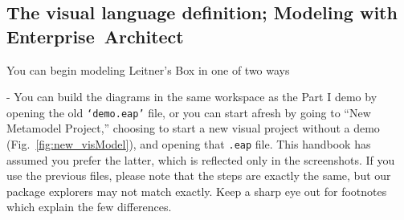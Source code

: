 \visHeader
\subsection[The visual language definition: Modeling with Diagrams]{The visual language definition; Modeling with \mbox{Enterprise Architect}}
\label{sec:staticAbstract}

\vspace{0.5cm}

\hypertarget{static vis}{You can begin modeling Leitner's Box in one of two ways} - You can build the diagrams in the same workspace as the Part I demo by opening the old \texttt{`demo.eap'} file, or you can start afresh by going to ``New Metamodel Project,'' choosing to start a new visual project without a demo (Fig.~\ref{fig:new_visModel}), and opening that \texttt{.eap} file. This handbook has assumed you prefer the latter, which is reflected only in the screenshots. If you use the previous files, please note that the steps are exactly the same, but our package explorers may not match exactly. Keep a sharp eye out for footnotes which explain the few differences.

